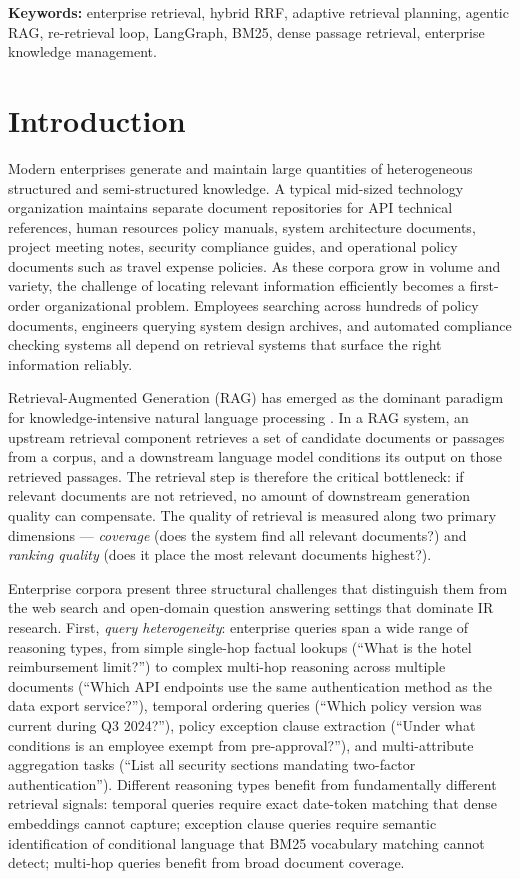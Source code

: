 \documentclass[11pt, a4paper]{article}
\begin{document}
\noindent\textbf{Keywords:} enterprise retrieval, hybrid RRF, adaptive retrieval planning, agentic RAG, re-retrieval loop, LangGraph, BM25, dense passage retrieval, enterprise knowledge management.

\section{Introduction}
\label{sec:intro}

Modern enterprises generate and maintain large quantities of heterogeneous structured and semi-structured knowledge. A typical mid-sized technology organization maintains separate document repositories for API technical references, human resources policy manuals, system architecture documents, project meeting notes, security compliance guides, and operational policy documents such as travel expense policies. As these corpora grow in volume and variety, the challenge of locating relevant information efficiently becomes a first-order organizational problem. Employees searching across hundreds of policy documents, engineers querying system design archives, and automated compliance checking systems all depend on retrieval systems that surface the right information reliably.

Retrieval-Augmented Generation (RAG) has emerged as the dominant paradigm for knowledge-intensive natural language processing \citep{lewis2020rag}. In a RAG system, an upstream retrieval component retrieves a set of candidate documents or passages from a corpus, and a downstream language model conditions its output on those retrieved passages. The retrieval step is therefore the critical bottleneck: if relevant documents are not retrieved, no amount of downstream generation quality can compensate. The quality of retrieval is measured along two primary dimensions --- \emph{coverage} (does the system find all relevant documents?) and \emph{ranking quality} (does it place the most relevant documents highest?).

Enterprise corpora present three structural challenges that distinguish them from the web search and open-domain question answering settings that dominate IR research. First, \emph{query heterogeneity}: enterprise queries span a wide range of reasoning types, from simple single-hop factual lookups (``What is the hotel reimbursement limit?'') to complex multi-hop reasoning across multiple documents (``Which API endpoints use the same authentication method as the data export service?''), temporal ordering queries (``Which policy version was current during Q3 2024?''), policy exception clause extraction (``Under what conditions is an employee exempt from pre-approval?''), and multi-attribute aggregation tasks (``List all security sections mandating two-factor authentication''). Different reasoning types benefit from fundamentally different retrieval signals: temporal queries require exact date-token matching that dense embeddings cannot capture; exception clause queries require semantic identification of conditional language that BM25 vocabulary matching cannot detect; multi-hop queries benefit from broad document coverage.
\end{document}
